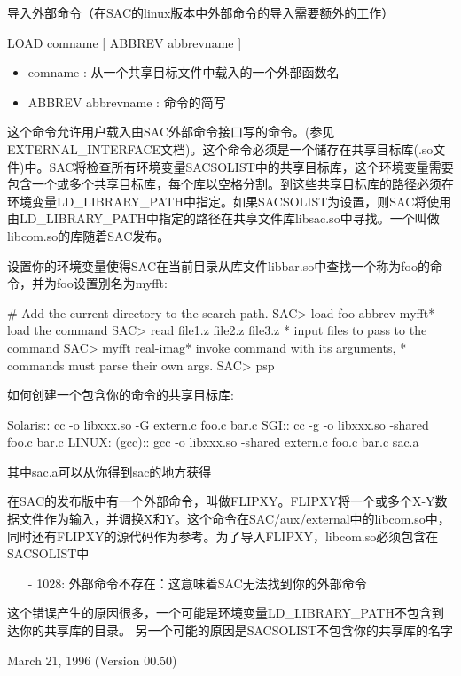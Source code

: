 \label{cmd:load}

导入外部命令（在SAC的linux版本中外部命令的导入需要额外的工作）

LOAD comname [ ABBREV abbrevname ]

\begin{itemize}
\item comname : 从一个共享目标文件中载入的一个外部函数名 
\item ABBREV abbrevname : 命令的简写 
\end{itemize}

这个命令允许用户载入由SAC外部命令接口写的命令。(参见EXTERNAL\_INTERFACE文档)。这个命令必须是一个储存在共享目标库(.so文件)中。SAC将检查所有环境变量SACSOLIST中的共享目标库，这个环境变量需要包含一个或多个共享目标库，每个库以空格分割。到这些共享目标库的路径必须在环境变量LD\_LIBRARY\_PATH中指定。如果SACSOLIST为设置，则SAC将使用由LD\_LIBRARY\_PATH中指定的路径在共享文件库libsac.so中寻找。一个叫做libcom.so的库随着SAC发布。

设置你的环境变量使得SAC在当前目录从库文件libbar.so中查找一个称为foo的命令，并为foo设置别名为myfft:
\begin{SACCode}
#  Add the current directory to the search path.
SAC> load foo abbrev myfft* load the command
SAC> read file1.z file2.z file3.z  * input files to pass to the command
SAC> myfft real-imag* invoke command with its arguments,
* commands must parse their own args.
SAC> psp
\end{SACCode}

如何创建一个包含你的命令的共享目标库:
\begin{SACCode}
Solaris::
cc -o libxxx.so -G extern.c foo.c bar.c
SGI::
cc -g -o libxxx.so -shared foo.c bar.c
LINUX: (gcc)::
gcc -o libxxx.so -shared extern.c foo.c bar.c sac.a
\end{SACCode}
其中sac.a可以从你得到sac的地方获得

在SAC的发布版中有一个外部命令，叫做FLIPXY。FLIPXY将一个或多个X-Y数据文件作为输入，并调换X和Y。这个命令在SAC/aux/external中的libcom.so中，同时还有FLIPXY的源代码作为参考。为了导入FLIPXY，libcom.so必须包含在SACSOLIST中

\begin{itemize}
\item[-]1028: 外部命令不存在：这意味着SAC无法找到你的外部命令
\end{itemize}

这个错误产生的原因很多，一个可能是环境变量LD\_LIBRARY\_PATH不包含到达你的共享库的目录。
另一个可能的原因是SACSOLIST不包含你的共享库的名字

March 21, 1996 (Version 00.50)

